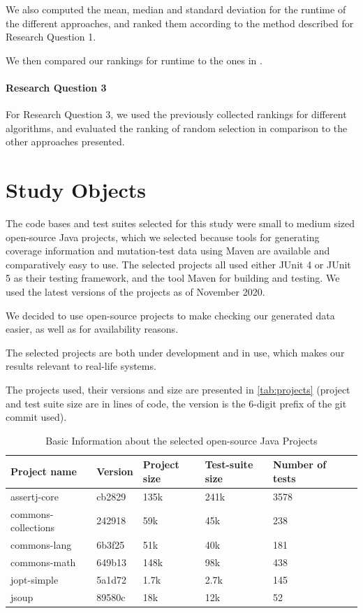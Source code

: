 We also computed the mean, median and standard deviation for the runtime
of the different approaches, and ranked them according to the method
described for Research Question 1.

We then compared our rankings for runtime to the ones in
\cite{cruciani2019scalable}.

\paragraph{Research Question 3}

For Research Question 3, we used the previously collected rankings
for different algorithms, and evaluated the ranking of random selection
in comparison to the other approaches presented.

\section{Study Objects}

The code bases and test suites selected for this study were small
to medium sized open-source Java projects, which we selected because
tools for generating coverage information and mutation-test data using
Maven are available and comparatively easy to use. The selected projects
all used either JUnit 4 or JUnit 5 as their testing framework, and the
tool Maven for building and testing. We used the latest versions of the
projects as of November 2020.

We decided to use open-source projects to make checking our generated
data easier, as well as for availability reasons.

The selected projects are both under development and in use, which makes
our results relevant to real-life systems.

The projects used, their versions and size are presented in
\autoref{tab:projects} (project and test suite size are in lines of code,
the version is the 6-digit prefix of the git commit used).

\begin{table}[htpb]
	\caption[Information about Projects Selected]{Basic Information about the selected open-source Java Projects}\label{tab:projects}
	\centering
	\begin{tabular}{l l l l l l}
		\toprule
		Project name & Version & Project size & Test-suite size & Number of tests \\
		\midrule
		assertj-core & cb2829 & 135k & 241k &3578 \\
		commons-collections & 242918 & 59k & 45k & 238 \\
		commons-lang & 6b3f25 & 51k & 40k & 181 \\
		commons-math & 649b13 & 148k & 98k & 438 \\
		jopt-simple & 5a1d72 & 1.7k & 2.7k & 145 \\
		jsoup & 89580c & 18k & 12k & 52 \\
		\bottomrule
	\end{tabular}
\end{table}

